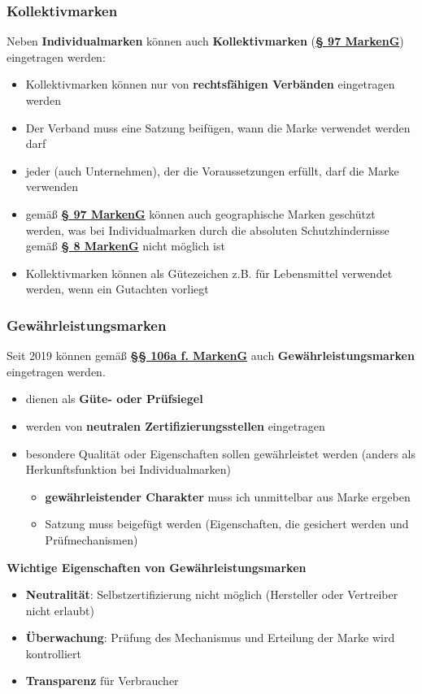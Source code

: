 \documentclass[12pt,A4]{extarticle}
\newcommand{\highlight}[1]{\textcolor{highlightColor}{\textbf{#1}}}
\newcommand{\markenG}[2][]{\textbf{\textcolor{markenGesetzLink}{\href{https://www.gesetze-im-internet.de/markeng/__#2.html}{§ #2 \ifthenelse{\equal{#1}{}}{}{#1 }MarkenG}}}}
\newcommand{\markenGG}[2][]{\textbf{\textcolor{markenGesetzLink}{\href{https://www.gesetze-im-internet.de/markeng/__#2.html}{§§ #1 MarkenG}}}}
\begin{document}
\subsubsection{Kollektivmarken}
Neben \highlight{Individualmarken} können auch \highlight{Kollektivmarken} (\markenG{97}) eingetragen werden:
\begin{itemize}
  \item{Kollektivmarken können nur von \textbf{rechtsfähigen Verbänden} eingetragen werden}
  \item{Der Verband muss eine Satzung beifügen, wann die Marke verwendet werden darf}
  \item{jeder (auch Unternehmen), der die Voraussetzungen erfüllt, darf die Marke verwenden}
  \item{gemäß \markenG[Abs. 1]{97} können auch geographische Marken geschützt werden, was bei Individualmarken durch die absoluten Schutzhindernisse gemäß \markenG[Abs. 2 S. 2]{8} nicht möglich ist}
  \item{Kollektivmarken können als Gütezeichen z.B. für Lebensmittel verwendet werden, wenn ein Gutachten vorliegt}
\end{itemize}

\subsubsection{Gewährleistungsmarken}
Seit 2019 können gemäß \markenGG[106a f.]{106a} auch \highlight{Gewährleistungsmarken} eingetragen werden.
\begin{itemize}
  \item{dienen als \textbf{Güte- oder Prüfsiegel}}
  \item{werden von \textbf{neutralen Zertifizierungsstellen} eingetragen}
  \item{besondere Qualität oder Eigenschaften sollen gewährleistet werden (anders als Herkunftsfunktion bei Individualmarken)
              \begin{itemize}
                \item{\textbf{gewährleistender Charakter} muss ich unmittelbar aus Marke ergeben}
                \item{Satzung muss beigefügt werden (Eigenschaften, die gesichert werden und Prüfmechanismen)}
              \end{itemize}
        }
\end{itemize}

\textbf{Wichtige Eigenschaften von Gewährleistungsmarken}
\begin{itemize}
  \item{\textbf{Neutralität}: Selbstzertifizierung nicht möglich (Hersteller oder Vertreiber nicht erlaubt)}
  \item{\textbf{Überwachung}: Prüfung des Mechanismus und Erteilung der Marke wird kontrolliert}
  \item{\textbf{Transparenz} für Verbraucher}
\end{itemize}
\end{document}
